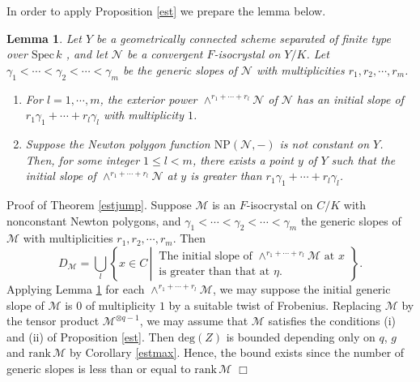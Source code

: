 \documentclass[11pt]{amsart}
\newtheorem{lemma}[Lemma]{Lemma}
\begin{document}
In order to apply Proposition \ref{est} we prepare the lemma below. 

\begin{lemma}\label{genericrank1} Let $Y$ be a geometrically connected scheme separated of finite type 
over $\mathrm{Spec}\, k$ , 
and let $\mathcal N$ be a convergent $F$-isocrystal on $Y/K$. 
Let $\gamma_1 < \cdots < \gamma_2 < \cdots <\gamma_m$ be the generic slopes of $\mathcal N$ 
with multiplicities $r_1, r_2, \cdots, r_m$. 
\begin{enumerate}
\item For $l = 1, \cdots, m$, the exterior power $\wedge^{r_1 + \cdots +r_l} \mathcal N$ of $\mathcal N$ 
has an initial slope of $r_1\gamma_1 + \cdots + r_l\gamma_l$ with multiplicity $1$. 
\item Suppose the Newton polygon function $\mathrm{NP}(\mathcal N, -)$ is not constant on $Y$. 
Then, for some integer $1 \leq l < m$, there exists a point $y$ of $Y$ such that 
the initial slope of $\wedge^{r_1 + \cdots +r_l} \mathcal N$ at $y$ is greater than $r_1\gamma_1 + \cdots + r_l\gamma_l$. 
\end{enumerate}
\end{lemma}

\noindent
{\sc Proof of Theorem \ref{estjump}.} Suppose $\mathcal M$ is an $F$-isocrystal on $C/K$ with 
nonconstant Newton polygons, 
and $\gamma_1 < \cdots < \gamma_2 < \cdots <\gamma_m$ the generic slopes of $\mathcal M$ 
with multiplicities $r_1, r_2, \cdots, r_m$. Then 
$$
   D_{\mathcal M} = \underset{l}{\bigcup} \left\{ x \in C\, \left|\, 
   \begin{array}{l} \mbox{The initial slope of $\wedge^{r_1 + \cdots +r_l} \mathcal M$ 
   at $x$} \\ \mbox{is greater than that at $\eta$.}\end{array} \right. \right\}. 
$$
Applying Lemma \ref{genericrank1} for each $\wedge^{r_1 + \cdots +r_l} \mathcal M$, we 
may suppose the initial generic slope of $\mathcal M$ is $0$ of multiplicity $1$ by a suitable twist of Frobenius. 
Replacing $\mathcal M$ by 
the tensor product $\mathcal M^{\otimes q-1}$, we may assume that 
$\mathcal M$ satisfies the conditions (i) and (ii) of Proposition \ref{est}. 
Then $\mathrm{deg}(Z)$ is bounded depending only on $q$, $g$ and $\mathrm{rank}\, \mathcal M$ 
by Corollary \ref{estmax}. 
Hence, the bound exists since the number of generic slopes is 
less than or equal to $\mathrm{rank}\, \mathcal M$
\hspace*{\fill} $\Box$
\end{document}
